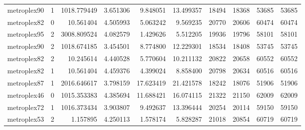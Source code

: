 \begin{longtable}{|l|r|r|r|r|r|r|r|r|r|}
metroplex90 & 1 & 1018.779449 & 3.651306 & 9.848051 & 13.499357 & 18494 & 18368 & 53685 & 53685 \\
metroplex82 & 0 & 10.561404 & 4.505993 & 5.063242 & 9.569235 & 20770 & 20606 & 60474 & 60474 \\
metroplex95 & 2 & 3008.809524 & 4.082579 & 1.429626 & 5.512205 & 19936 & 19796 & 58101 & 58101 \\
metroplex90 & 2 & 1018.674185 & 3.454501 & 8.774800 & 12.229301 & 18534 & 18408 & 53745 & 53745 \\
metroplex82 & 2 & 10.245614 & 4.440528 & 5.770604 & 10.211132 & 20822 & 20658 & 60552 & 60552 \\
metroplex82 & 1 & 10.561404 & 4.459376 & 4.399024 & 8.858400 & 20798 & 20634 & 60516 & 60516 \\
metroplex87 & 1 & 2016.646617 & 3.798159 & 17.623419 & 21.421578 & 18242 & 18076 & 51906 & 51906 \\
metroplex46 & 0 & 1015.353383 & 4.385694 & 11.688421 & 16.074115 & 21322 & 21150 & 62009 & 62009 \\
metroplex72 & 1 & 1016.373434 & 3.903807 & 9.492637 & 13.396444 & 20254 & 20114 & 59150 & 59150 \\
metroplex53 & 2 & 1.157895 & 4.250113 & 1.578174 & 5.828287 & 21018 & 20854 & 60719 & 60719 \\
\end{longtable}
